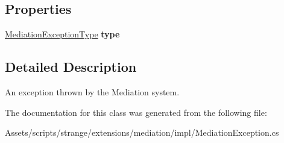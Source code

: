 \subsection*{Properties}
\begin{DoxyCompactItemize}
\item 
\hypertarget{classstrange_1_1extensions_1_1mediation_1_1impl_1_1_mediation_exception_aa23e9c77b69d735c3aaa1b32253b1555}{\hyperlink{namespacestrange_1_1extensions_1_1mediation_1_1api_aef97993ec02a40c5f887dbfaf4f06e4a}{Mediation\-Exception\-Type} {\bfseries type}}\label{classstrange_1_1extensions_1_1mediation_1_1impl_1_1_mediation_exception_aa23e9c77b69d735c3aaa1b32253b1555}

\end{DoxyCompactItemize}


\subsection{Detailed Description}
An exception thrown by the Mediation system. 

The documentation for this class was generated from the following file\-:\begin{DoxyCompactItemize}
\item 
Assets/scripts/strange/extensions/mediation/impl/Mediation\-Exception.\-cs\end{DoxyCompactItemize}
